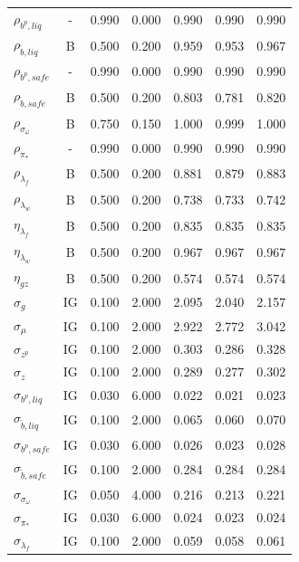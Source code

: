 \documentclass[12pt]{article}
\begin{document}
{\begin{longtable}{lcccccc}
$\rho_{b^p,liq}$ & - &    0.990 &    0.000 &    0.990 &    0.990 &    0.990 \\
$\rho_{\tilde{b},liq}$ & B &    0.500 &    0.200 &    0.959 &    0.953 &    0.967 \\
$\rho_{b^p,safe}$ & - &    0.990 &    0.000 &    0.990 &    0.990 &    0.990 \\
$\rho_{\tilde{b},safe}$ & B &    0.500 &    0.200 &    0.803 &    0.781 &    0.820 \\
$\rho_{\sigma_\omega}$ & B &    0.750 &    0.150 &    1.000 &    0.999 &    1.000 \\
$\rho_{\pi_*}$ & - &    0.990 &    0.000 &    0.990 &    0.990 &    0.990 \\
$\rho_{\lambda_f}$ & B &    0.500 &    0.200 &    0.881 &    0.879 &    0.883 \\
$\rho_{\lambda_w}$ & B &    0.500 &    0.200 &    0.738 &    0.733 &    0.742 \\
$\eta_{\lambda_f}$ & B &    0.500 &    0.200 &    0.835 &    0.835 &    0.835 \\
$\eta_{\lambda_w}$ & B &    0.500 &    0.200 &    0.967 &    0.967 &    0.967 \\
$\eta_{gz}$ & B &    0.500 &    0.200 &    0.574 &    0.574 &    0.574 \\
$\sigma_{g}$ & IG &    0.100 &    2.000 &    2.095 &    2.040 &    2.157 \\
$\sigma_{\mu}$ & IG &    0.100 &    2.000 &    2.922 &    2.772 &    3.042 \\
$\sigma_{z^p}$ & IG &    0.100 &    2.000 &    0.303 &    0.286 &    0.328 \\
$\sigma_{z}$ & IG &    0.100 &    2.000 &    0.289 &    0.277 &    0.302 \\
$\sigma_{b^p, liq}$ & IG &    0.030 &    6.000 &    0.022 &    0.021 &    0.023 \\
$\sigma_{\tilde{b}, liq}$ & IG &    0.100 &    2.000 &    0.065 &    0.060 &    0.070 \\
$\sigma_{b^p, safe}$ & IG &    0.030 &    6.000 &    0.026 &    0.023 &    0.028 \\
$\sigma_{\tilde{b}, safe}$ & IG &    0.100 &    2.000 &    0.284 &    0.284 &    0.284 \\
$\sigma_{\sigma_\omega}$ & IG &    0.050 &    4.000 &    0.216 &    0.213 &    0.221 \\
$\sigma_{\pi_*}$ & IG &    0.030 &    6.000 &    0.024 &    0.023 &    0.024 \\
$\sigma_{\lambda_f}$ & IG &    0.100 &    2.000 &    0.059 &    0.058 &    0.061 \\

\end{longtable}}
\end{document}
